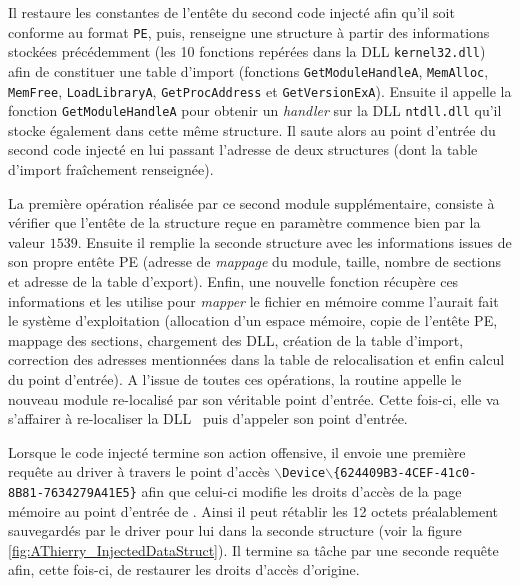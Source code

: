 Il restaure les constantes de l'entête du second code injecté afin qu'il soit conforme au format \texttt{PE}, puis, renseigne une structure à partir des informations stockées précédemment (les 10 fonctions repérées dans la DLL \texttt{kernel32.dll}) afin de constituer une table d'import (fonctions \texttt{GetModuleHandleA}, \texttt{MemAlloc}, \texttt{MemFree}, \texttt{LoadLibraryA}, \texttt{GetProcAddress} et \texttt{GetVersionExA}). Ensuite il appelle la fonction \texttt{GetModuleHandleA} pour obtenir un \emph{handler} sur la DLL  \texttt{ntdll.dll} qu'il stocke également dans cette même structure. Il saute alors au point d'entrée du second code injecté en lui passant l'adresse de deux structures (dont la table d'import fraîchement renseignée). 

La première opération réalisée par ce second module supplémentaire, consiste à vérifier que l'entête de la structure reçue en paramètre commence bien par la valeur $1539$. Ensuite il remplie la seconde structure avec les informations issues de son propre entête PE (adresse de \emph{mappage} du module, taille, nombre de sections et adresse de la table d'export). Enfin, une nouvelle fonction récupère ces informations et les utilise pour \emph{mapper} le fichier en mémoire comme l'aurait fait le système d'exploitation (allocation d'un espace mémoire, copie de l'entête PE, mappage des sections, chargement des DLL, création de la table d'import, correction des adresses mentionnées dans la table de relocalisation et enfin calcul du point d'entrée). A l'issue de toutes ces opérations, la routine appelle le nouveau module re-localisé par son véritable point d'entrée. Cette fois-ci, elle va s'affairer à re-localiser la DLL \netpDLL\ puis d'appeler son point d'entrée. 






Lorsque le code injecté termine son action offensive, il envoie une première requête au driver à travers le point d'accès $\backslash$\texttt{Device}$\backslash$\texttt{\{624409B3-4CEF-41c0-8B81-7634279A41E5\}} afin que celui-ci modifie les droits d'accès de la page mémoire au point d'entrée de \service. Ainsi il peut rétablir les 12 octets préalablement sauvegardés par le driver pour lui dans la seconde structure (voir la figure \ref{fig:AThierry_InjectedDataStruct}). Il termine sa tâche par une seconde requête afin, cette fois-ci, de restaurer les droits d'accès d'origine.  


